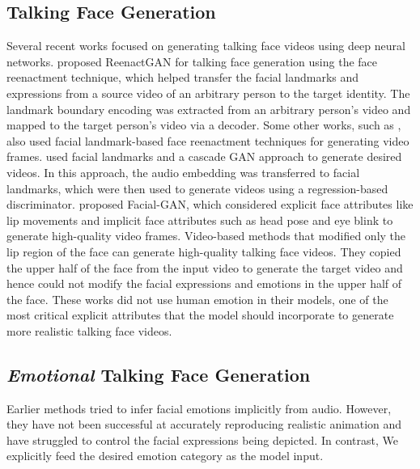\documentclass[accepted]{uai2023}
\begin{document}
\subsection{Talking Face Generation}
Several recent works focused on generating talking face videos using deep neural networks. \citet{wu2018reenactgan} proposed ReenactGAN for talking face generation using the face reenactment technique, which helped transfer the facial landmarks and expressions from a source video of an arbitrary person to the target identity. The landmark boundary encoding was extracted from an arbitrary person's video and mapped to the target person's video via a decoder.
Some other works, such as \citep{Huang_2020_CVPR, Zhang_2020_CVPR}, also used facial landmark-based face reenactment techniques for generating video frames. \citet{chen2019hierarchical} used facial landmarks and a cascade GAN approach to generate desired videos. In this approach, the audio embedding was transferred to facial landmarks, which were then used to generate videos using a regression-based discriminator. \citet{Zhang_2021_ICCV} proposed Facial-GAN, which considered explicit face attributes like lip movements and implicit face attributes such as head pose and eye blink to generate high-quality video frames. Video-based methods that modified only the lip region of the face \citep{prajwal2020lip, thies2020neural, wen2020photorealistic, song2022everybody, wang2022attention} can generate high-quality talking face videos. They copied the upper half of the face from the input video to generate the target video and hence could not modify the facial expressions and emotions in the upper half of the face.
These works did not use human emotion in their models, one of the most critical explicit attributes that the model should incorporate to generate more realistic talking face videos.

\subsection{\textit{Emotional} Talking Face Generation}
Earlier methods \citep{DBLP:journals/corr/abs-1906-06337, https://doi.org/10.48550/arxiv.2007.08547} tried to infer facial emotions implicitly from audio. However, they have not been successful at accurately reproducing realistic animation and have struggled to control the facial expressions being depicted. In contrast, We explicitly feed the desired emotion category as the model input.
\end{document}
